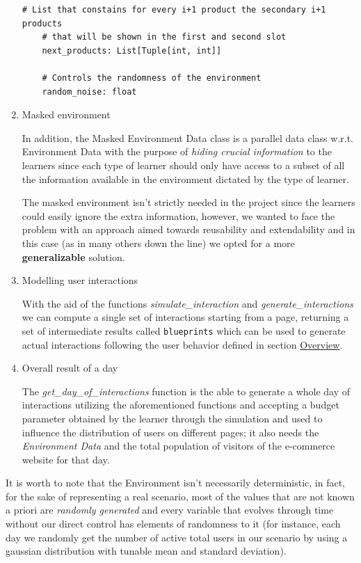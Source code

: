 \begin{enumerate}
\begin{lstlisting}[style=Python]
    # List that constains for every i+1 product the secondary i+1 products
    # that will be shown in the first and second slot
    next_products: List[Tuple[int, int]]

    # Controls the randomness of the environment
    random_noise: float
    \end{lstlisting}

    \item Masked environment

    In addition, the Masked Environment Data class is a parallel data class w.r.t. Environment Data with the purpose of \textit{hiding crucial information} to the learners since each type of learner should only have access to a subset of all the information available in the environment dictated by the type of learner.

    The masked environment isn't strictly needed in the project since the learners could easily ignore the extra information, however, we wanted to face the problem with an approach aimed towards reusability and extendability and in this case (as in many others down the line) we opted for a more \textbf{generalizable} solution.

    \item Modelling user interactions

    With the aid of the functions \textit{simulate\_interaction} and \textit{generate\_interactions} we can compute a single set of interactions starting from a page, returning a set of intermediate results called \texttt{blueprints} which can be used to generate actual interactions following the user behavior defined in section \hyperref[sec:intro_overview]{Overview}.

    \item Overall result of a day

    The \textit{get\_day\_of\_interactions} function is the able to generate a whole day of interactions utilizing the aforementioned functions and accepting a budget parameter obtained by the learner through the simulation and used to influence the distribution of users on different pages; it also needs the \textit{Environment Data} and the total population of visitors of the e-commerce website for that day.
\end{enumerate}

It is worth to note that the Environment isn't necessarily deterministic, in fact, for the sake of representing a real scenario, most of the values that are not known a priori are \textit{randomly generated} and every variable that evolves through time without our direct control has elements of randomness to it (for instance, each day we randomly get the number of active total users in our scenario by using a gaussian distribution with tunable mean and standard deviation).

